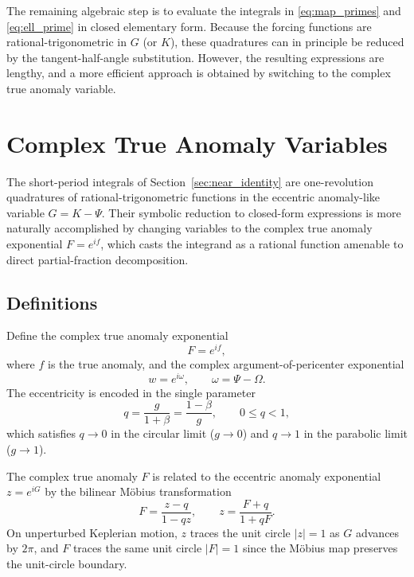 \documentclass[11pt]{article}
\begin{document}
The remaining algebraic step is to evaluate the integrals in
\eqref{eq:map_primes} and \eqref{eq:ell_prime} in closed elementary form.
Because the forcing functions are rational-trigonometric in $G$ (or $K$),
these quadratures can in principle be reduced by the tangent-half-angle
substitution. However, the resulting expressions are lengthy, and a more
efficient approach is obtained by switching to the complex true anomaly
variable.

\section{Complex True Anomaly Variables}
\label{sec:complex_tav}

The short-period integrals of Section~\ref{sec:near_identity} are
one-revolution quadratures of rational-trigonometric functions in the
eccentric anomaly-like variable $G = K - \Psi$. Their symbolic reduction to
closed-form expressions is more naturally accomplished by changing variables
to the complex true anomaly exponential $F = e^{if}$, which casts the
integrand as a rational function amenable to direct partial-fraction
decomposition.

\subsection{Definitions}

Define the complex true anomaly exponential
\begin{equation}
F = e^{if},
\label{eq:F_def}
\end{equation}
where $f$ is the true anomaly, and the complex argument-of-pericenter
exponential
\begin{equation}
w = e^{i\omega}, \qquad \omega = \Psi - \Omega.
\label{eq:w_def}
\end{equation}
The eccentricity is encoded in the single parameter
\begin{equation}
q = \frac{g}{1+\beta} = \frac{1-\beta}{g},
\qquad 0 \le q < 1,
\label{eq:q_def}
\end{equation}
which satisfies $q \to 0$ in the circular limit ($g \to 0$) and $q \to 1$ in
the parabolic limit ($g \to 1$).

The complex true anomaly $F$ is related to the eccentric anomaly exponential
$z = e^{iG}$ by the bilinear M\"obius transformation
\begin{equation}
F = \frac{z - q}{1 - qz},
\qquad
z = \frac{F + q}{1 + qF}.
\label{eq:F_z_mobius}
\end{equation}
On unperturbed Keplerian motion, $z$ traces the unit circle $|z| = 1$ as $G$
advances by $2\pi$, and $F$ traces the same unit circle $|F| = 1$ since the
M\"obius map preserves the unit-circle boundary.
\end{document}
